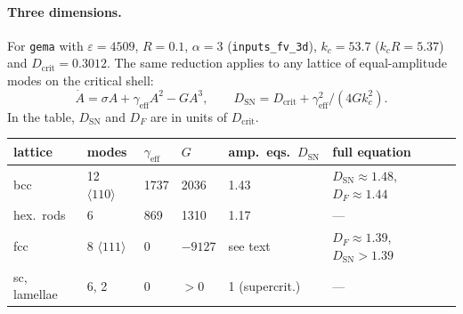 \documentclass[11pt]{article}
\newcommand{\code}[1]{\texttt{#1}}
\begin{document}
\paragraph{Three dimensions.} For \code{gema} with $\varepsilon=4509$,
$R=0.1$, $\alpha=3$ (\code{inputs\_fv\_3d}), $k_c = 53.7$ ($k_cR=5.37$) and
$D_{\mathrm{crit}} = 0.3012$. The same reduction applies to any lattice of
equal-amplitude modes on the critical shell:
\begin{equation}
  \dot A = \sigma A + \gamma_{\mathrm{eff}}A^2 - G A^3, \qquad
  D_{\mathrm{SN}} = D_{\mathrm{crit}} + \gamma_{\mathrm{eff}}^2/(4Gk_c^2).
\end{equation}
In the table, $D_{\mathrm{SN}}$ and $D_F$ are in units of $D_{\mathrm{crit}}$.
\begin{center}
\begin{tabular}{@{}llllll@{}}
\toprule
lattice & modes & $\gamma_{\mathrm{eff}}$ & $G$ & amp.\ eqs.\ $D_{\mathrm{SN}}$ & full equation \\
\midrule
bcc & 12 $\langle110\rangle$ & 1737 & 2036 & 1.43 & $D_{\mathrm{SN}}\approx1.48$, $D_F\approx1.44$ \\
hex.\ rods & 6 & 869 & 1310 & 1.17 & --- \\
fcc & 8 $\langle111\rangle$ & 0 & $-9127$ & see text & $D_F\approx1.39$, $D_{\mathrm{SN}}>1.39$ \\
sc, lamellae & 6, 2 & 0 & $>0$ & 1 (supercrit.) & --- \\
\bottomrule
\end{tabular}
\end{center}
\end{document}
